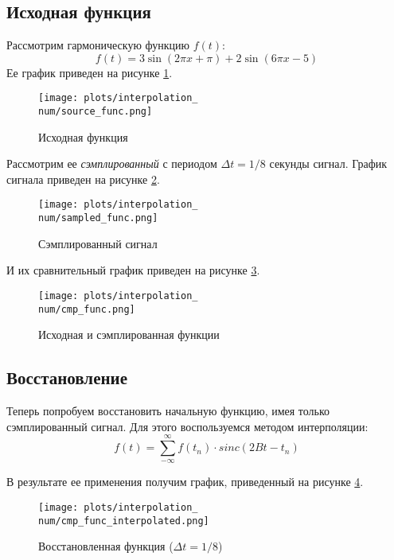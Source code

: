 \subsection{Исходная функция}
Рассмотрим гармоническую функцию $f(t)$:
\begin{equation}
    f(t) = 3 \sin(2\pi x + \pi) + 2\sin(6 \pi x - 5)
\end{equation}
\def\num{1}
Ее график приведен на рисунке \ref{fig:source_func\num}.
\begin{figure}[ht!]
    \centering
    \texttt{[image: plots/interpolation\_\\num/source\_func.png]}
    \caption{Исходная функция}
    \label{fig:source_func\num}
\end{figure}

Рассмотрим ее \textit{сэмплированный} с периодом $\Delta t = 1/8$ секунды сигнал. График сигнала приведен на рисунке \ref{fig:sampled_func\num}.
\begin{figure}[ht!]
    \centering
    \texttt{[image: plots/interpolation\_\\num/sampled\_func.png]}
    \caption{Сэмплированный сигнал}
    \label{fig:sampled_func\num}
\end{figure}

И их сравнительный график приведен на рисунке \ref{fig:source_sampled_func\num}.
\begin{figure}[ht!]
    \centering
    \texttt{[image: plots/interpolation\_\\num/cmp\_func.png]}
    \caption{Исходная и сэмплированная функции}
    \label{fig:source_sampled_func\num}
\end{figure}

\subsection{Восстановление}
Теперь попробуем восстановить начальную функцию, имея только сэмплированный сигнал. Для этого воспользуемся методом интерполяции: 
\begin{equation}
    f(t) = \sum_{-\infty}^{\infty} f(t_n) \cdot sinc\left(2B{t - t_n}\right)
\end{equation}

В результате ее применения получим график, приведенный на рисунке \ref{fig:interpolated_func\num}.
\begin{figure}[ht!]
    \centering
    \texttt{[image: plots/interpolation\_\\num/cmp\_func\_interpolated.png]}
    \caption{Восстановленная функция ($\Delta t = 1/8$)}
    \label{fig:interpolated_func\num}
\end{figure}

